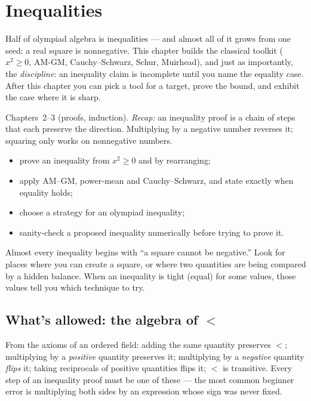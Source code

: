 \chapter{Inequalities}

Half of olympiad algebra is inequalities --- and almost all of it grows
from one seed: a real square is nonnegative. This chapter builds the
classical toolkit ($x^2 \ge 0$, AM-GM, Cauchy--Schwarz, Schur, Muirhead),
and just as importantly, the \emph{discipline}: an inequality claim is
incomplete until you name the equality case. After this chapter you can
pick a tool for a target, prove the bound, and exhibit the case where it
is sharp.

\begin{rulebox}
Chapters~2--3 (proofs, induction). \emph{Recap:} an inequality proof is a chain of steps that each preserve the direction. Multiplying by a negative number reverses it; squaring only works on nonnegative numbers.
\end{rulebox}
\begin{wins}
\begin{itemize}
\item prove an inequality from $x^2\ge0$ and by rearranging;
\item apply AM--GM, power-mean and Cauchy--Schwarz, and state exactly when equality holds;
\item choose a strategy for an olympiad inequality;
\item sanity-check a proposed inequality numerically before trying to prove it.
\end{itemize}
\end{wins}
\begin{principle}
Almost every inequality begins with ``a square cannot be negative.'' Look for places where you can create a square, or where two quantities are being compared by a hidden balance. When an inequality is tight (equal) for some values, those values tell you which technique to try.
\end{principle}

\section{What's allowed: the algebra of $<$}

From the axioms of an ordered field: adding the
same quantity preserves $<$; multiplying by a \emph{positive} quantity
preserves it; multiplying by a \emph{negative} quantity \emph{flips} it;
taking reciprocals of positive quantities flips it; $<$ is transitive.
Every step of an inequality proof must be one of these --- the most
common beginner error is multiplying both sides by an expression whose
sign was never fixed.

